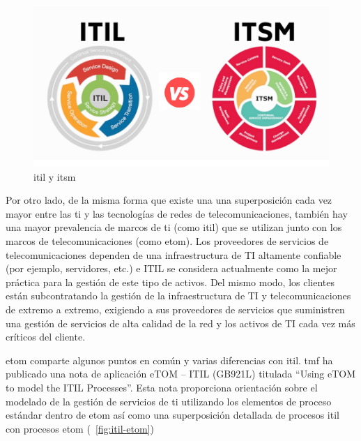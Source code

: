 \begin{figure}[H]
  \centering
  \includegraphics[width=\textwidth]{imaxes/itil-vs-itsm.png}
  \caption{ \acrshort{itil} y \acrshort{itsm}}
  \label{fig:itil-vs-itsm}
\end{figure}



Por otro lado, de la misma forma que existe una una superposición cada vez mayor entre las \acrshort{ti} y las tecnologías de redes de telecomunicaciones, también hay una mayor prevalencia de marcos de \acrshort{ti} (como \acrshort{itil}) que se utilizan junto con los marcos de telecomunicaciones (como \acrshort{etom}). Los proveedores de servicios de telecomunicaciones dependen de una infraestructura de TI altamente confiable (por ejemplo, servidores, etc.) e ITIL se considera actualmente como la mejor práctica para la gestión de este tipo de activos. Del mismo modo, los clientes están subcontratando la gestión de la infraestructura de TI y telecomunicaciones de extremo a extremo, exigiendo a sus proveedores de servicios que suministren una gestión de servicios de alta calidad de la red y los activos de TI cada vez más críticos del cliente.


\acrshort{etom} comparte algunos puntos en común y varias diferencias con \acrshort{itil}. \acrshort{tmf} ha publicado una nota de aplicación eTOM – ITIL (GB921L) titulada ``Using eTOM to model the ITIL Processes''. Esta nota proporciona orientación sobre el modelado de la gestión de servicios de \acrshort{ti} utilizando los elementos de proceso estándar dentro de \acrshort{etom} así como una superposición detallada de procesos \acrshort{itil} con procesos \acrshort{etom} (\figurename ~\ref{fig:itil-etom})



